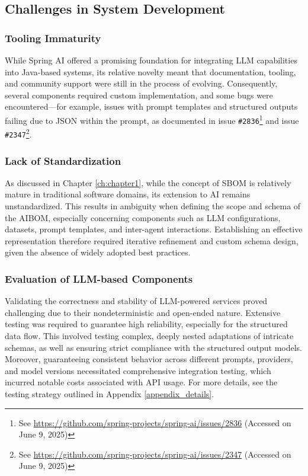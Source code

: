 \subsection{Challenges in System Development}

\subsubsection{Tooling Immaturity }
While Spring AI offered a promising foundation for integrating LLM capabilities into Java-based systems, its relative novelty meant that documentation, tooling, and community support were still in the process of evolving. Consequently, several components required custom implementation, and some bugs were encountered—for example, issues with prompt templates and structured outputs failing due to JSON within the prompt, as documented in issue \texttt{\#2836}\footnote{See \url{https://github.com/spring-projects/spring-ai/issues/2836} (Accessed on June 9, 2025)} and issue \texttt{\#2347}\footnote{See \url{https://github.com/spring-projects/spring-ai/issues/2347} (Accessed on June 9, 2025)}.

\subsubsection{Lack of Standardization}
As discussed in Chapter \ref{ch:chapter1}, while the concept of SBOM is relatively mature in traditional software domains, its extension to AI remains unstandardized. This results in ambiguity when defining the scope and schema of the AIBOM, especially concerning components such as LLM configurations, datasets, prompt templates, and inter-agent interactions. Establishing an effective representation therefore required iterative refinement and custom schema design, given the absence of widely adopted best practices.


\subsubsection{Evaluation of LLM-based Components}
Validating the correctness and stability of LLM-powered services proved challenging due to their nondeterministic and open-ended nature. Extensive testing was required to guarantee high reliability, especially for the structured data flow. This involved testing complex, deeply nested adaptations of intricate schemas, as well as ensuring strict compliance with the structured output models. Moreover, guaranteeing consistent behavior across different prompts, providers, and model versions necessitated comprehensive integration testing, which incurred notable costs associated with API usage. For more details, see the testing strategy outlined in Appendix \ref{appendix_details}.



